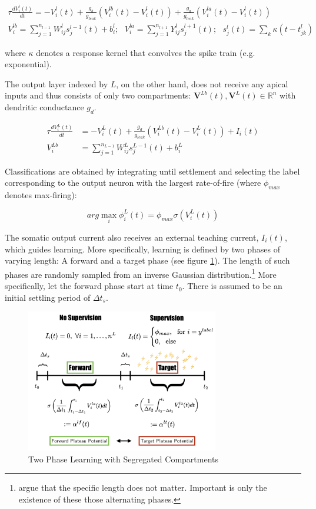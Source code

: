 \documentclass[colorinlistoftodos]{article}
\theoremstyle{definition}
\def\R{\mathbb{R}}
\begin{document}
	\begin{align*}
		\tau \frac{dV_i^l(t)}{dt} = -V_i^l(t) + \frac{g_b}{g_{leak}}\left(V_i^{lb}(t) - V_i^l(t)\right) +\frac{g_a}{g_{leak}}\left(V_i^{la}(t) - V_i^l(t)\right)\\
		V_i^{lb} = \sum_{j=1}^{n_{l-1}} W_{ij}^l s_j^{l-1}(t) + b_i^l; \ \ \ V_i^{la} = \sum_{j=1}^{n_{l+1}} Y_{ij}^l s^{l+1}_j(t); \ \ \
		s_j^{l}(t) = \sum_k \kappa(t-t_{jk}^{l})
	\end{align*}

where $\kappa$ denotes a response kernel that convolves the spike train (e.g. exponential).
	
The output layer indexed by $L$, on the other hand, does not receive any apical inputs and thus consists of only two compartments: $\mathbf{V}^{Lb}(t), \mathbf{V}^{L}(t) \in \R^n$ with dendritic conductance $g_d$. 

\begin{align*}
		\tau \frac{dV_i^L(t)}{dt} &= -V_i^L(t) + \frac{g_d}{g_{leak}}\left(V_i^{Lb}(t) - V_i^L(t) \right) + I_i(t)\\
		V_i^{Lb} &= \sum_{j=1}^{n_{L-1}} W_{ij}^L s_j^{L-1}(t) + b_i^L
\end{align*}

Classifications are obtained by integrating until settlement and selecting the label corresponding to the output neuron with the largest rate-of-fire (where $\phi_{max}$ denotes max-firing):

$$arg\max_i \phi^L_i(t) = \phi_{max} \sigma(V_i^L(t))$$

The somatic output current also receives an external teaching current, $I_i(t)$, which guides learning. More specifically, learning is defined by two phases of varying length: A forward and a target phase (see figure \ref{fig:phases}). The length of such phases are randomly sampled from an inverse Gaussian distribution.\footnote{\citet{guerguiev2017} argue that the specific length does not matter. Important is only the existence of these those alternating phases.}
More specifically, let the forward phase start at time $t_0$. There is assumed to be an initial settling period of $\Delta t_s$.

\begin{figure}[H]
\centering
\includegraphics[width=0.75\textwidth]{../figures/report/phases_3}
\caption{\label{fig:phases} Two Phase Learning with Segregated Compartments}
\end{figure}	
 
\end{document}
